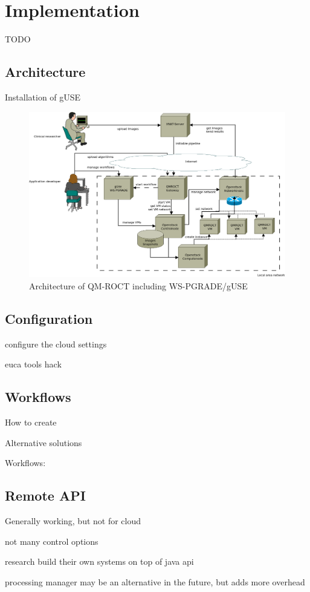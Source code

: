 \section{Implementation}\label{implementation}

TODO

\subsection{Architecture}\label{architecture}

Installation of gUSE

\begin{figure}%
                \centering
                \includegraphics[width=2.0\columnwidth]{images/somno-architecture.png}
                \caption{Architecture of QM-ROCT \cite{wu14} including WS-PGRADE/gUSE}
                \label{fig:architecture}
\end{figure}

\subsection{Configuration}\label{configuration}

configure the cloud settings

euca tools hack

\subsection{Workflows}\label{workflowimplementation}

How to create

Alternative solutions

Workflows: \cite{somnocqrs} \cite{somnocqrsdl} \cite{somnocqrsone}

\subsection{Remote API}\label{api}

Generally working, but not for cloud

not many control options

research build their own systems on top of java api

processing manager may be an alternative in the future, but adds more overhead